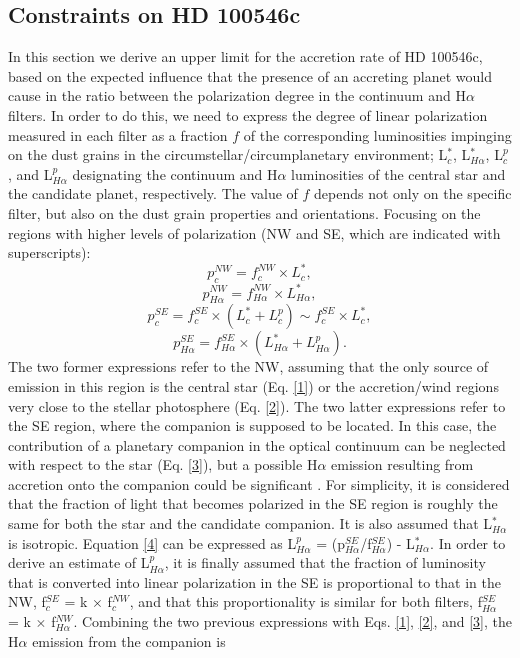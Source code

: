 \documentclass{aa}
\begin{document}
\subsection{Constraints on HD 100546c}
\label{Sect:hd100546c}

In this section we derive an upper limit for the accretion rate of HD 100546c, based on the expected influence that the presence of an accreting planet would cause in the ratio between the polarization degree in the continuum and H$\alpha$ filters. In order to do this, we need to express the degree of linear polarization measured in each filter as a fraction $f$ of the corresponding luminosities impinging on the dust grains in the circumstellar/circumplanetary environment; L$_c^*$, L$_{H\alpha}^*$, L$_c^p$, and L$_{H\alpha}^p$ designating the continuum and H$\alpha$ luminosities of the central star and the candidate planet, respectively. The value of $f$ depends not only on the specific filter, but also on the dust grain properties and orientations. Focusing on the regions with higher levels of polarization (NW and SE, which are indicated with superscripts):
\begin{equation}
\label{1}
 p_c^{NW} = f_c^{NW} \times L_c^*,
\end{equation}
\begin{equation}
\label{2}
p_{H\alpha}^{NW} = f_{H\alpha}^{NW} \times L_{H\alpha}^*,
\end{equation}
\begin{equation}
\label{3}
 p_c^{SE} = f_c^{SE} \times (L_c^* + L_c^p) \sim f_c^{SE} \times L_c^*,
\end{equation}
\begin{equation}
\label{4}
p_{H\alpha}^{SE} = f_{H\alpha}^{SE} \times (L_{H\alpha}^* + L_{H\alpha}^p).
\end{equation}
The two former expressions refer to the NW, assuming that the only source of emission in this region is the central star (Eq. \ref{1}) or the accretion/wind regions very close to the stellar photosphere (Eq. \ref{2}). The two latter expressions refer to the SE region, where the companion is supposed to be located. In this case, the contribution of a planetary companion in the optical continuum can be neglected with respect to the star (Eq. \ref{3}), but a possible H$\alpha$ emission resulting from accretion onto the companion could be significant \citep[Eq. \ref{4}; see, e.g.,][]{Bowler14,Zhou14,Sallum15,Zhu15}. For simplicity, it is considered that the fraction of light that becomes polarized in the SE region is roughly the same for both the star and the candidate companion. It is also assumed that L$_{H\alpha}^*$ is isotropic. Equation \ref{4} can be expressed as L$_{H\alpha}^p$ = (p$_{H\alpha}^{SE}$/f$_{H\alpha}^{SE}$) - L$_{H\alpha}^*$. In order to derive an estimate of L$_{H\alpha}^p$, it is finally assumed that the fraction of luminosity that is converted into linear polarization in the SE is proportional to that in the NW, f$_c^{SE}$ = k $\times$ f$_c^{NW}$, and that this proportionality is similar for both filters, f$_{H\alpha}^{SE}$ = k $\times$ f$_{H\alpha}^{NW}$. Combining the two previous expressions with Eqs. \ref{1}, \ref{2}, and \ref{3}, the H$\alpha$ emission from the companion is
\end{document}
